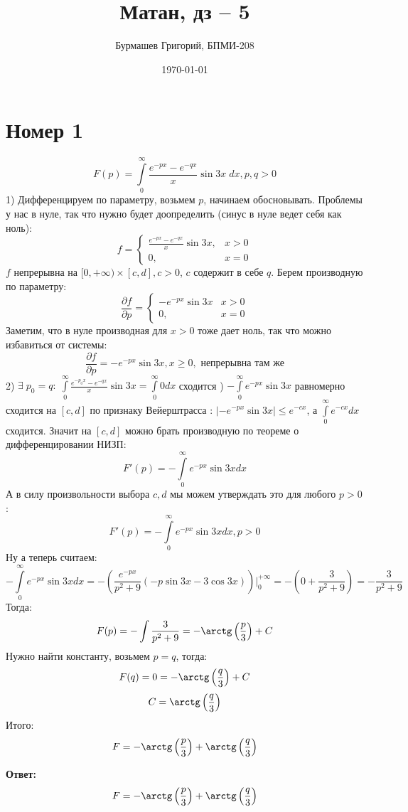 \documentclass[a4paper,12pt]{article}
\author{Бурмашев Григорий, БПМИ-208}
\title{Матан, дз -- 5}
\date{\today}
\begin{document}
\maketitle
\section*{Номер 1}
\[
F(p) = \int\limits_0^{\infty} \frac{e^{-px} - e^{-qx}}{x} \sin 3x \; dx, p, q > 0
\]
1)
Дифференцируем по параметру, возьмем $p$, начинаем обосновывать. Проблемы у нас в нуле, так что нужно будет доопределить (синус в нуле ведет себя как ноль):
\[
f = 
\begin{cases}
\frac{e^{-px} - e^{-qx}}{x} \sin 3x, &x > 0 \\
0, &x = 0 
\end{cases}
\]
$f$ непрерывна на $[0, +\infty) \times [c, d], c > 0$, $c$ содержит в себе $q$. Берем производную по параметру:
\[
\frac{\partial f}{\partial p}  =
\begin{cases}
 -e^{-px} \sin 3x &x > 0\\
0, &x = 0
\end{cases}
\]
Заметим, что в нуле производная для $x > 0$ тоже дает ноль, так что можно избавиться от системы:
\[
\frac{\partial f}{\partial p}  =  -e^{-px} \sin 3x, x \geq 0,  \text{ непрерывна там же}
\]
2) $\exists \; p_0 = q : \; \int\limits_0^{\infty} \frac{e^{-p_0x} - e^{-qx}}{x} \sin 3x =  \int\limits_0^{\infty} 0 dx $ сходится
) $ -\int\limits_0^{\infty} e^{-px} \sin 3x $ равномерно сходится на $[c, d]$ по признаку Вейерштрасса : $|-e^{-px} \sin 3x | \leq e^{-cx} $, а $\int\limits_0^{\infty} e^{-cx} dx $ сходится. Значит на $[c, d]$ можно брать производную по теореме о дифференцировании НИЗП:
\[
F'(p) = - \int\limits_0^{\infty} e^{-px} \sin 3x dx 
\]
А в силу произвольности выбора $c, d$ мы можем утверждать это для любого $p > 0 $:
\[
F'(p) = - \int\limits_0^{\infty} e^{-px} \sin 3x dx , p > 0
\]
Ну а теперь считаем:
\[
- \int\limits_0^{\infty} e^{-px} \sin 3x dx  = - \left(\frac{e^{-px}}{p^2 + 9}
 \left(
-p \sin 3x - 3 \cos 3 x 
 \right)
\right)
\Bigg|_0^{+\infty} = - 
\left( 
0 + \frac{3}{p^2 + 9}
\right)
=
- \frac{3}{p^2 + 9}
\]
Тогда:
\[
F(p) = - \int \frac{3}{p^2 + 9} =  - \arctg \left( \frac{p}{3}\right) + C
\]
Нужно найти константу, возьмем $p = q$, тогда:
\[
F(q) = 0 = - \arctg \left( \frac{q}{3}\right) + C
\]
\[
C = \arctg \left( \frac{q}{3}\right)
\]
Итого:
\[
F = -  \arctg \left( \frac{p}{3}\right) +  \arctg \left( \frac{q}{3}\right)
\]
\begin{center}
\textbf{Ответ: } 
\[
F = -  \arctg \left( \frac{p}{3}\right) +  \arctg \left( \frac{q}{3}\right)
\]
\end{center}
\clearpage
\end{document}
